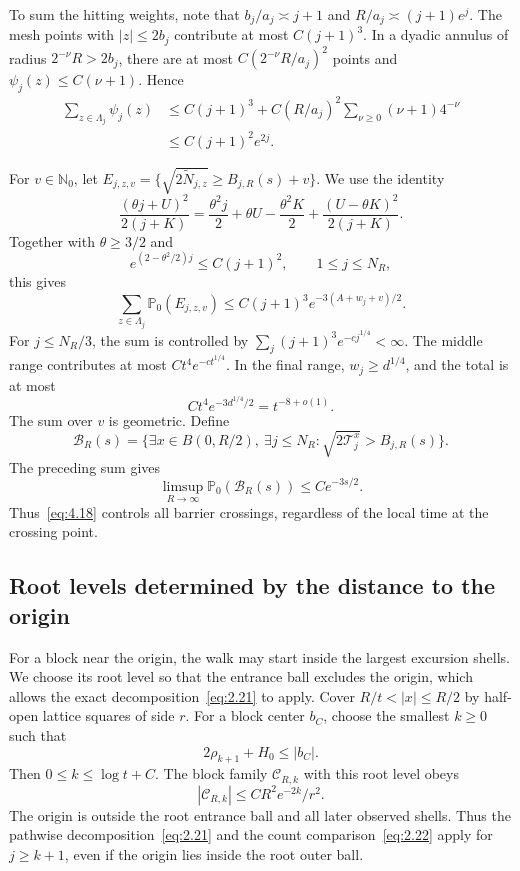 \documentclass[11pt,letterpaper,reqno]{amsart}
\numberwithin{equation}{section}
\theoremstyle{remark}
\begin{document}
To sum the hitting weights, note that $b_j/a_j\asymp j+1$ and
$R/a_j\asymp(j+1)e^j$. The mesh points with $|z|\le2b_j$ contribute at most $C(j+1)^3$. In a dyadic annulus of radius $2^{-\nu}R>2b_j$, there are at most $C(2^{-\nu}R/a_j)^2$ points and $\psi_j(z)\le C(\nu+1)$. Hence
\begin{equation}\label{eq:4.15}
\begin{aligned}
\sum_{z\in\Lambda_j}\psi_j(z)
&\le C(j+1)^3+C(R/a_j)^2\sum_{\nu\ge0}(\nu+1)4^{-\nu}\\
&\le C(j+1)^2e^{2j}.
\end{aligned}
\end{equation}

For $v\in\mathbb N_0$, let
$E_{j,z,v}=\{\sqrt{2\widetilde N_{j,z}}\ge B_{j,R}(s)+v\}$.
We use the identity
\begin{equation}\label{eq:4.16}
\frac{(\theta j+U)^2}{2(j+K)}
=\frac{\theta^2j}{2}+\theta U-\frac{\theta^2K}{2}
+\frac{(U-\theta K)^2}{2(j+K)}.
\end{equation}
Together with $\theta\ge3/2$ and
\[
e^{(2-\theta^2/2)j}\le C(j+1)^2,\qquad 1\le j\le N_R,
\]
this gives
\begin{equation}\label{eq:4.17}
\sum_{z\in\Lambda_j}\mathbb P_0(E_{j,z,v})
\le C(j+1)^3e^{-3(A+w_j+v)/2}.
\end{equation}
For $j\le N_R/3$, the sum is controlled by $\sum_j(j+1)^3e^{-cj^{1/4}}<\infty$. The middle range contributes at most $Ct^4e^{-ct^{1/4}}$. In the final range, $w_j\ge d^{1/4}$, and the total is at most
\[
Ct^4e^{-3d^{1/4}/2}=t^{-8+o(1)}.
\]
The sum over $v$ is geometric. Define
\[
\mathcal B_R(s)=\{\exists x\in B(0,R/2),\ \exists j\le N_R:
\sqrt{2\mathcal T_j^x}>B_{j,R}(s)\}.
\]
The preceding sum gives
\begin{equation}\label{eq:4.18}
\limsup_{R\to\infty}\mathbb P_0(\mathcal B_R(s))\le Ce^{-3s/2}.
\end{equation}
Thus~\eqref{eq:4.18} controls all barrier crossings, regardless of the local time at the crossing point.

\subsection{Root levels determined by the distance to the origin}\label{sec:rootlevels}
For a block near the origin, the walk may start inside the largest excursion shells. We choose its root level so that the entrance ball excludes the origin, which allows the exact decomposition~\eqref{eq:2.21} to apply. Cover $R/t<|x|\le R/2$ by half-open lattice squares of side $r$. For a block center $b_C$, choose the smallest $k\ge0$ such that
\begin{equation}\label{eq:4.19}
2\rho_{k+1}+H_0\le|b_C|.
\end{equation}
Then $0\le k\le\log t+C$. The block family $\mathscr C_{R,k}$ with this root level obeys
\begin{equation}\label{eq:4.20}
|\mathscr C_{R,k}|\le C R^2e^{-2k}/r^2.
\end{equation}
The origin is outside the root entrance ball and all later observed shells. Thus the pathwise decomposition~\eqref{eq:2.21} and the count comparison~\eqref{eq:2.22} apply for $j\ge k+1$, even if the origin lies inside the root outer ball.
\end{document}
